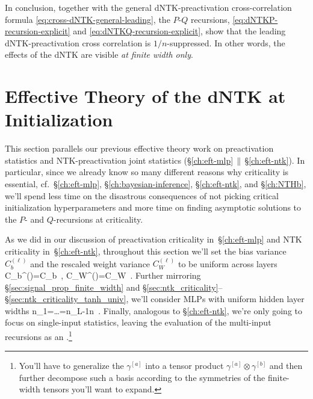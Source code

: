 In conclusion, together with the general dNTK-preactivation cross-correlation formula \eqref{eq:cross-dNTK-general-leading}, the $P$-$Q$ recursions, \eqref{eq:dNTKP-recursion-explicit} and \eqref{eq:dNTKQ-recursion-explicit}, show that the leading dNTK-preactivation cross correlation is $1/n$-suppressed. In other words, the effects of the dNTK are visible \emph{at finite width only}.



\section{Effective Theory of the dNTK at Initialization}\label{sec:dNTK-criticality}
This section parallels our previous effective theory work on preactivation statistics and NTK-preactivation joint statistics (\S\ref{ch:eft-mlp}$\,\parallel\,$\S\ref{ch:eft-ntk}). In particular, 
since we already know so many different reasons why criticality is essential, cf.~\S\ref{ch:eft-mlp}, \S\ref{ch:bayesian-inference}, \S\ref{ch:eft-ntk}, and \S\ref{ch:NTHb}, we'll spend less time on the disastrous consequences of not picking critical initialization hyperparameters and more time on finding asymptotic solutions to the $P$- and $Q$-recursions at criticality.


As we did in our discussion of preactivation criticality in~\S\ref{ch:eft-mlp} and NTK criticality in~\S\ref{ch:eft-ntk}, throughout this section we'll set the bias variance $C_b^{(\ell)}$ and the rescaled weight variance $C_W^{(\ell)}$ to be uniform across layers
\be\label{eq:ntk-chapter-initialziation-hyperparameters-dropped-layer-dependence-reprint}
C_b^{(\ell)}=C_b\, , \qquad C_W^{(\ell)}=C_W\, .
\ee
Further mirroring \S\ref{sec:signal_prop_finite_width} and \S\ref{sec:ntk_criticality}--\S\ref{sec:ntk_criticality_tanh_univ}, we'll consider MLPs with uniform hidden layer widths
\be\label{eq:ntk-chapter-layer-widths-equalized-reprint}
n_1=\ldots=n_{L-1}\equiv n\, .
\ee
Finally, analogous to \S\ref{ch:eft-ntk},  we're only going to focus on single-input statistics, leaving the evaluation of the multi-input recursions as an .\footnote{\label{foot:thrill-seekers-guide}You'll have to generalize the $\gamma^{[a]}$ into a tensor product $\gamma^{[a]} \otimes \gamma^{[b]}$ and then further decompose such a basis according to the symmetries of the finite-width tensors you'll want to expand.
}


